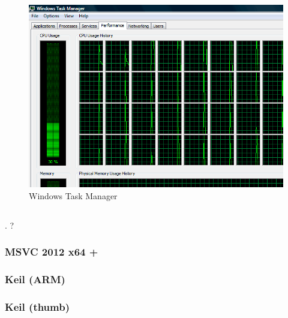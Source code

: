 \begin{figure}[H]
\centering
\includegraphics[scale=0.66]{exercises/taskmgr_64cpu_crop.png}
\caption{ Windows Task Manager}
\end{figure}

\subsection{}

.
?

\subsubsection{MSVC 2012 x64 + }



\subsubsection{Keil (ARM)}



\subsubsection{Keil (thumb)}



\subsection{}

